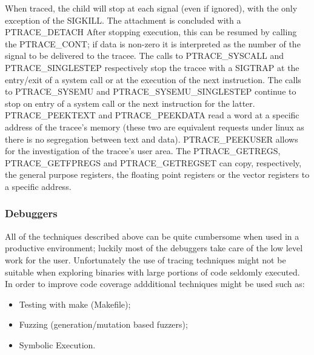When traced, the child will stop at each signal (even if ignored), with the only exception of the {\ttfamily SIGKILL}.
The attachment is concluded with a {\ttfamily PTRACE\_DETACH}
After stopping execution, this can be resumed by calling the {\ttfamily PTRACE\_CONT}; if data is non-zero it is interpreted as the number of the signal to be delivered to the tracee.
The calls to {\ttfamily PTRACE\_SYSCALL} and {\ttfamily PTRACE\_SINGLESTEP} respectively stop the tracee with a {\ttfamily SIGTRAP} at the entry/exit of a system call or at the execution of the next instruction.
The calls to {\ttfamily PTRACE\_SYSEMU} and {\ttfamily PTRACE\_SYSEMU\_SINGLESTEP} continue to stop on entry of a system call or the next instruction for the latter.
{\ttfamily PTRACE\_PEEKTEXT} and {\ttfamily PTRACE\_PEEKDATA} read a word at a specific address of the tracee's memory (these two are equivalent requests under linux as there is no segregation between text and data).
{\ttfamily PTRACE\_PEEKUSER} allows for the investigation of the tracee's user area.
The {\ttfamily PTRACE\_GETREGS}, {\ttfamily PTRACE\_GETFPREGS} and {\ttfamily PTRACE\_GETREGSET} can copy, respectively, the general purpose registers, the floating point registers or the vector registers to a specific address.
\subsubsection{Debuggers}
All of the techniques described above can be quite cumbersome when used in a productive environment; luckily most of the debuggers take care of the low level work for the user. Unfortunately the use of tracing techniques might not be suitable when exploring binaries with large portions of code seldomly executed. In order to improve code coverage addditional techniques might be used such as:
\begin{itemize}
    \item Testing with make (Makefile);
    \item Fuzzing (generation/mutation based fuzzers);
    \item Symbolic Execution.
\end{itemize}
